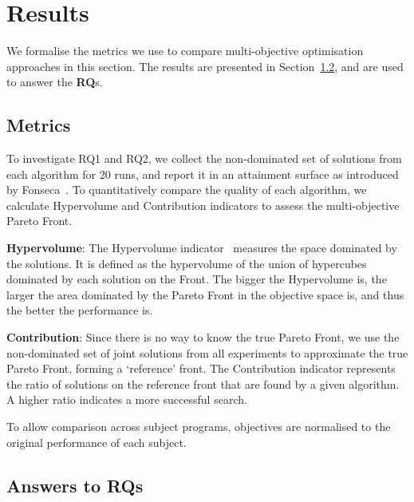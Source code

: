 
\section{Results}
\label{sec_results}


We formalise the metrics we use to compare multi-objective optimisation approaches in this section.
The results are presented in Section~\ref{sec_answers}, and are used to answer the \textbf{RQ}s.

\subsection{Metrics}
\label{sec_matrics}

To investigate RQ1 and RQ2, we collect the non-dominated set of solutions from each algorithm for 20 runs, and report it in an attainment surface as introduced by Fonseca~\cite{attainment_surface:1996}. To quantitatively compare the quality of each algorithm, we calculate Hypervolume and Contribution indicators to assess the multi-objective Pareto Front.

\textbf{Hypervolume}: The Hypervolume indicator~\cite{797969} measures the space dominated by the solutions. It is defined as the hypervolume of the union of hypercubes dominated by each solution on the Front. The bigger the Hypervolume is, the larger the area dominated by the Pareto Front in the objective space is, and thus the better the performance is.

\textbf{Contribution}: Since there is no way to know the true Pareto Front, we use the non-dominated set of joint solutions from all experiments to approximate the true Pareto Front, forming a `reference' front. The Contribution indicator represents the ratio of solutions on the reference front that are found by a given algorithm. A higher ratio indicates a more successful search. 

To allow comparison across subject programs, objectives are normalised to the original performance of each subject.

\subsection{Answers to RQs}
\label{sec_answers}

\newcommand{\shallow}{Sha}
\newcommand{\all}{All}
\newcommand{\randomsearch}{Rand}
\newcommand{\nsgaii}{NSGA}
\newcommand{\sr}{\emph{\shallow\randomsearch}}
\newcommand{\sn}{\emph{\shallow\nsgaii}}
\newcommand{\dr}{\emph{\all\randomsearch}}
\newcommand{\dn}{\emph{\all\nsgaii}}

